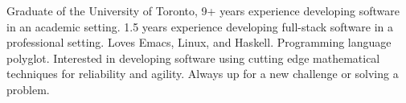 

\begin{cvparagraph}

  Graduate of the University of Toronto, 9+ years experience developing software
  in an academic setting. 1.5 years experience developing full-stack software in
  a professional setting. Loves Emacs, Linux, and Haskell. Programming language
  polyglot. Interested in developing software using cutting edge mathematical
  techniques for reliability and agility. Always up for a new challenge or
  solving a problem.
\end{cvparagraph}
